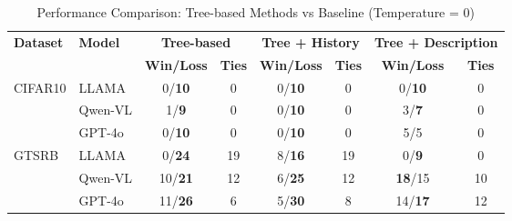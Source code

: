 \begin{table*}[ht]
\centering
\caption{Performance Comparison: Tree-based Methods vs Baseline (Temperature = 0)}
\begin{tabular}{ll|cc|cc|cc}
\hline
\multirow{2}{*}{\textbf{Dataset}} & \multirow{2}{*}{\textbf{Model}}
& \multicolumn{2}{c|}{\textbf{Tree-based}}
& \multicolumn{2}{c|}{\textbf{Tree + History}}
& \multicolumn{2}{c}{\textbf{Tree + Description}} \\
\cline{3-8}
& & \textbf{Win/Loss} & \textbf{Ties} & \textbf{Win/Loss} & \textbf{Ties} & \textbf{Win/Loss} & \textbf{Ties} \\
\hline
\multirow{3}{*}{CIFAR10} & LLAMA & 0/\textbf{10} & 0 & 0/\textbf{10} & 0 & 0/\textbf{10} & 0 \\
 & Qwen-VL & 1/\textbf{9} & 0 & 0/\textbf{10} & 0 & 3/\textbf{7} & 0 \\
 & GPT-4o & 0/\textbf{10} & 0 & 0/\textbf{10} & 0 & 5/5 & 0 \\
\hline
\multirow{3}{*}{GTSRB} & LLAMA & 0/\textbf{24} & 19 & 8/\textbf{16} & 19 & 0/\textbf{9} & 0 \\
 & Qwen-VL & 10/\textbf{21} & 12 & 6/\textbf{25} & 12 & \textbf{18}/15 & 10 \\
 & GPT-4o & 11/\textbf{26} & 6 & 5/\textbf{30} & 8 & 14/\textbf{17} & 12 \\
\hline
\end{tabular}
\label{tab:performance_comparison}
\end{table*}